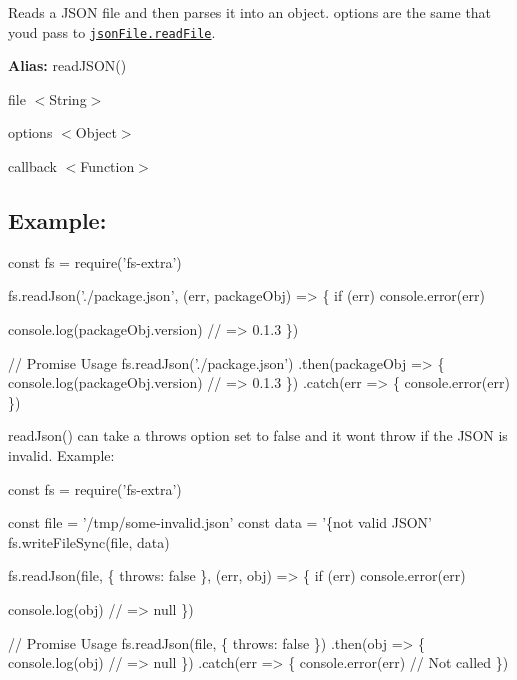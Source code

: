 Reads a J\+S\+ON file and then parses it into an object. {\ttfamily options} are the same that you\textquotesingle{}d pass to \href{https://github.com/jprichardson/node-jsonfile#readfilefilename-options-callback}{\tt {\ttfamily json\+File.\+read\+File}}.

{\bfseries Alias\+:} {\ttfamily read\+J\+S\+O\+N()}


\begin{DoxyItemize}
\item {\ttfamily file} {\ttfamily $<$String$>$}
\item {\ttfamily options} {\ttfamily $<$Object$>$}
\item {\ttfamily callback} {\ttfamily $<$Function$>$}
\end{DoxyItemize}

\subsection*{Example\+:}


\begin{DoxyCode}
const fs = require('fs-extra')

fs.readJson('./package.json', (err, packageObj) => \{
  if (err) console.error(err)

  console.log(packageObj.version) // => 0.1.3
\})

// Promise Usage
fs.readJson('./package.json')
.then(packageObj => \{
  console.log(packageObj.version) // => 0.1.3
\})
.catch(err => \{
  console.error(err)
\})
\end{DoxyCode}
 



{\ttfamily read\+Json()} can take a {\ttfamily throws} option set to {\ttfamily false} and it won\textquotesingle{}t throw if the J\+S\+ON is invalid. Example\+:


\begin{DoxyCode}
const fs = require('fs-extra')

const file = '/tmp/some-invalid.json'
const data = '\{not valid JSON'
fs.writeFileSync(file, data)

fs.readJson(file, \{ throws: false \}, (err, obj) => \{
  if (err) console.error(err)

  console.log(obj) // => null
\})

// Promise Usage
fs.readJson(file, \{ throws: false \})
.then(obj => \{
  console.log(obj) // => null
\})
.catch(err => \{
  console.error(err) // Not called
\})
\end{DoxyCode}
 
